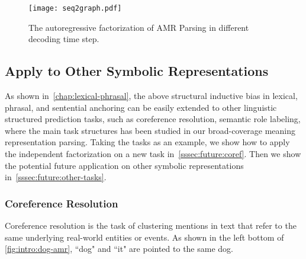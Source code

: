 \begin{figure}[h]
\begin{center}
\texttt{[image: seq2graph.pdf]}
\end{center}
\caption{\label{fig:autoreg-example}The autoregressive factorization
  of AMR Parsing in different decoding time step.}
\end{figure}

\subsection{Apply to Other Symbolic Representations}
\label{ssec:future:other-application}

As shown in~\autoref{chap:lexical-phrasal}, the above structural
inductive bias in lexical, phrasal, and sentential anchoring can be
easily extended to other linguistic structured prediction tasks, such
as coreference resolution, semantic role labeling, where the main task
structures has been studied in our broad-coverage meaning
representation parsing. Taking the  tasks
as an example, we show how to apply the independent factorization on a
new task in~\autoref{sssec:future:coref}. Then we show the potential
future application on other symbolic representations
in~\autoref{sssec:future:other-tasks}.

\subsubsection[Coreference Resolution]{Coreference Resolution}
\label{sssec:future:coref}
 Coreference resolution is the task of clustering mentions in
text that refer to the same underlying real-world entities or
events. As shown in the left bottom of \autoref{fig:intro:dog-amr},
``dog" and ``it" are pointed to the same dog.

